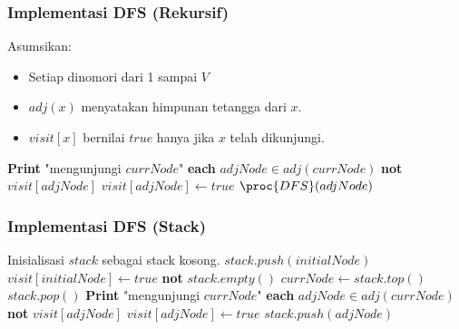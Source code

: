 \begin{frame}[fragile]
\frametitle{Implementasi DFS (Rekursif)}
%
Asumsikan:
\begin{itemize}
  \item Setiap \fnode dinomori dari 1 sampai $V$
  \item $adj(x)$ menyatakan himpunan tetangga dari \fnode $x$.
  \item $visit[x]$ bernilai $true$ hanya jika $x$ telah dikunjungi.
\end{itemize}
\begin{codebox}
  \li \textbf{Print} "mengunjungi $currNode$"
  \li \For \textbf{each} $adjNode \in adj(currNode)$ \Do
  \li   \If \textbf{not} $visit[adjNode]$ \Then
  \li     $visit[adjNode] \gets true$
  \li     $\proc{DFS}(adjNode)$
        \End
      \End
\end{codebox}
\end{frame}

\begin{frame}[fragile]
\frametitle{Implementasi DFS (Stack)}
%
%        
\begin{codebox}
  \li \Comment Inisialisasi $stack$ sebagai stack kosong.
  \li $stack.push(initialNode)$
  \li $visit[initialNode] \gets true$
  \li \While \textbf{not} $stack.empty()$ \Do
  \li   $currNode \gets stack.top()$
  \li   $stack.pop()$
  \li   \textbf{Print} "mengunjungi $currNode$"
  \li   \For \textbf{each} $adjNode \in adj(currNode)$ \Do
  \li     \If \textbf{not} $visit[adjNode]$ \Then
  \li       $visit[adjNode] \gets true$
  \li       $stack.push(adjNode)$
          \End
        \End
      \End
\end{codebox}
\end{frame}

